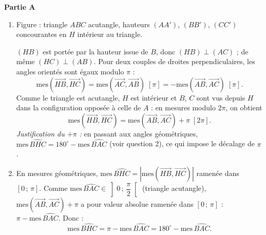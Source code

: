\documentclass[11pt]{article}
\begin{document}
\begin{corrige}
\textbf{Partie A}
\begin{enumerate}
\item Figure : triangle $ABC$ acutangle, hauteurs $(AA')$, $(BB')$, $(CC')$ concourantes en $H$ intérieur au triangle.

$(HB)$ est portée par la hauteur issue de $B$, donc $(HB) \perp (AC)$ ; de même $(HC) \perp (AB)$. Pour deux couples de droites perpendiculaires, les angles orientés sont égaux modulo $\pi$ :
\[ \mathrm{mes}(\overrightarrow{HB}, \overrightarrow{HC}) = \mathrm{mes}(\overrightarrow{AC}, \overrightarrow{AB}) \; [\pi] = -\mathrm{mes}(\overrightarrow{AB}, \overrightarrow{AC}) \; [\pi]. \]
Comme le triangle est acutangle, $H$ est intérieur et $B$, $C$ sont vus depuis $H$ dans la configuration opposée à celle de $A$ : en mesures modulo $2\pi$, on obtient
\[ \mathrm{mes}(\overrightarrow{HB}, \overrightarrow{HC}) = \mathrm{mes}(\overrightarrow{AB}, \overrightarrow{AC}) + \pi \; [2\pi]. \]
\emph{Justification du $+\pi$ :} en passant aux angles géométriques, $\mathrm{mes}\,\widehat{BHC} = 180^{\circ} - \mathrm{mes}\,\widehat{BAC}$ (voir question 2), ce qui impose le décalage de $\pi$.
\item En mesures géométriques, $\mathrm{mes}\,\widehat{BHC} = \left|\mathrm{mes}(\overrightarrow{HB}, \overrightarrow{HC})\right|$ ramenée dans $[0\,;\,\pi]$. Comme $\mathrm{mes}\,\widehat{BAC} \in \left]0\,;\,\dfrac{\pi}{2}\right[$ (triangle acutangle), $\mathrm{mes}(\overrightarrow{AB}, \overrightarrow{AC}) + \pi$ a pour valeur absolue ramenée dans $[0\,;\,\pi]$ : $\pi - \mathrm{mes}\,\widehat{BAC}$. Donc :
\[ \mathrm{mes}\,\widehat{BHC} = \pi - \mathrm{mes}\,\widehat{BAC} = 180^{\circ} - \mathrm{mes}\,\widehat{BAC}. \]
\end{enumerate}


\end{corrige}
\end{document}
